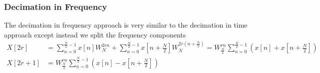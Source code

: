 \documentclass{article}
\begin{document}
\subsubsection{Decimation in Frequency}
The decimation in frequency approach is very similar to the decimation in time approach except instead we split the frequency components
\begin{align*}
  X[2r] &= \sum_{n=0}^{\frac{N}{2}-1}x[n]W_N^{2rn}+\sum_{n=0}^{\frac{N}{2}-1}x\left[n+\frac{N}{2}\right]W_N^{2r\left(n+\frac{N}{2}\right)}=W_{\frac{N}{2}}^{rn}\sum_{n=0}^{\frac{N}{2}-1}\left(x[n]+x\left[n+\frac{N}{2}\right]\right)\\
  X[2r+1] &= W_{\frac{N}{2}}^{rn}\sum_{n=0}^{\frac{N}{2}-1}\left(x[n]-x\left[n+\frac{N}{2}\right]\right)
\end{align*}
\end{document}
